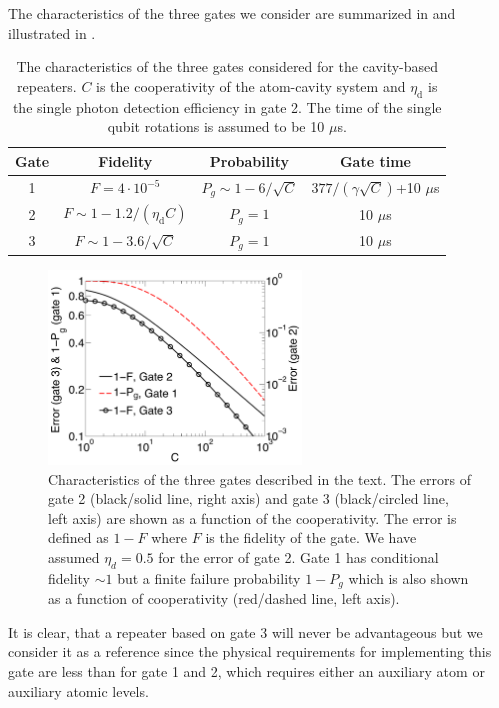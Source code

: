 The characteristics of the three gates we consider are summarized in
 and illustrated in .
\begin{table} 
\centering
\begin{tabular}{|c|c|c|c|}
\hline
Gate & Fidelity & Probability & Gate time  \\ \hline
1  & $F=4\cdot10^{-5}$ & $P_{g}\sim1-6/\sqrt{C}$ & $377/(\gamma\sqrt{C})$+10 $\mu$s\\ \hline
2 & $F\sim1-1.2/(\eta_{\text{d}}C)$ & $P_{g}=1$ &10 $\mu$s  \\ \hline
3 & $F\sim1-3.6/\sqrt{C}$ & $P_{g}=1$ &10 $\mu$s \\ \hline
\end{tabular}
\caption{The characteristics of the three gates considered for the cavity-based
repeaters. $C$ is the cooperativity of the atom-cavity system and
$\eta_{\text{d}}$ is the single photon detection efficiency in gate 2. The time
of the single qubit rotations is assumed to be 10 $\mu$s. }
\label{tab:table2}
\end{table}
\begin{figure} 
\centering
\includegraphics[width=0.6\textwidth]{./figs_Borregaard_PRA2015/figureX2}
\caption[CNOT gates comparison]{Characteristics of the three gates described in
the text. The errors of gate 2 (black/solid line, right axis) and gate 3
(black/circled line, left axis) are shown as a function of the cooperativity.
The error is defined as $1-F$ where $F$ is the fidelity of the gate. We have
assumed $\eta_{d}=0.5$ for the error of gate 2. Gate 1 has conditional fidelity
$\sim1$ but a finite failure probability $1-P_{g}$ which is also shown as a
function of cooperativity (red/dashed line, left axis).}
\label{fig:figureX2}
\end{figure} 
It is clear, that a repeater based on gate 3 will never be advantageous but we
consider it as a reference since the physical requirements for implementing this
gate are less than for gate 1 and 2, which requires either an auxiliary atom or
auxiliary atomic levels.

